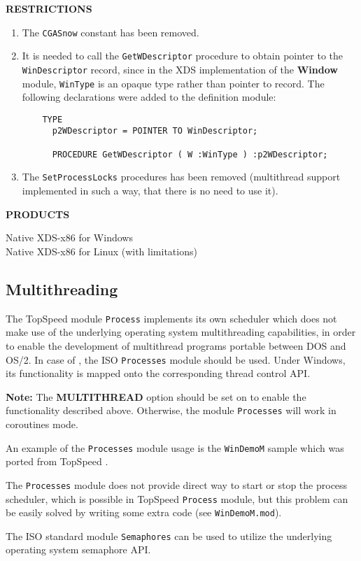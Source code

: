 {\bf RESTRICTIONS}

\begin{enumerate}
\item The \verb'CGASnow' constant has been removed.

\item It is needed to call the \verb'GetWDescriptor' procedure to obtain
      pointer to the \verb'WinDescriptor' record, since in the XDS
      implementation of the {\bf Window} module,  \verb'WinType' is an opaque type
      rather than pointer to record. The following declarations were
      added to the definition module:

\begin{verbatim}
    TYPE
      p2WDescriptor = POINTER TO WinDescriptor;

      PROCEDURE GetWDescriptor ( W :WinType ) :p2WDescriptor;
\end{verbatim}

\item The \verb'SetProcessLocks' procedures has been removed (multithread
      support implemented in such a way, that there is no need to use it).
\end{enumerate}

{\bf PRODUCTS}

Native XDS-x86 for Windows\\
Native XDS-x86 for Linux (with limitations)

\subsection{Multithreading}
\label{mt}

    The TopSpeed module \verb'Process' implements its own scheduler which does
    not make use of the underlying operating system multithreading capabilities,
    in order to enable the development of multithread programs portable between
    DOS and OS/2. In case of \xds{}, the ISO \verb'Processes' module should be used.
    Under Windows, its functionality is mapped onto
    the corresponding thread control API.

    {\bf Note:} The {\bf MULTITHREAD} option should be set on to enable the
    functionality described above. Otherwise, the module \verb'Processes' will
    work in coroutines mode.

    An example of the \verb'Processes' module usage is the \verb'WinDemoM'
    sample which was ported from TopSpeed \mt{}.

    The \verb'Processes' module does not provide direct way to start or stop the
    process scheduler, which is possible in TopSpeed \verb'Process' module, but this
    problem can be easily solved by writing some extra code (see \verb'WinDemoM.mod').

    The ISO standard module \verb'Semaphores' can be used to utilize the underlying
    operating system semaphore API.


